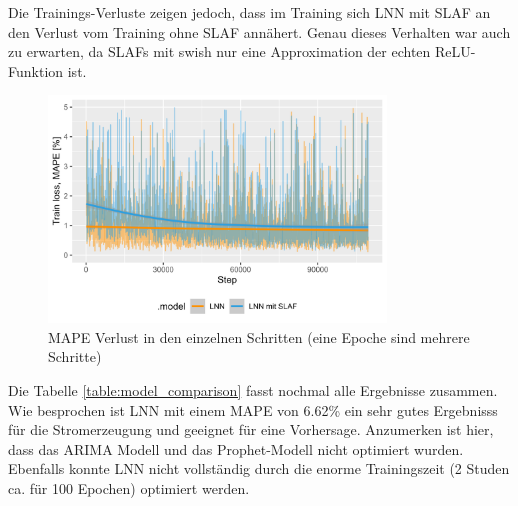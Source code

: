 \documentclass[11pt,ngerman,a4paper,]{article}
\begin{document}
Die Trainings-Verluste zeigen jedoch, dass im Training sich LNN mit SLAF an den Verlust vom Training ohne SLAF annähert. Genau dieses Verhalten war auch zu erwarten, da SLAFs mit swish nur eine Approximation der echten ReLU-Funktion ist.

\begin{figure}[H]
\centering
\includegraphics[width=0.8\textwidth]{plots/training_loss.png}
\caption{MAPE Verlust in den einzelnen Schritten (eine Epoche sind mehrere Schritte)}
\label{fig:train_loss}
\end{figure}

\clearpage
\newpage

Die Tabelle \ref{table:model_comparison} fasst nochmal alle Ergebnisse zusammen. Wie besprochen ist LNN mit einem MAPE von 6.62\% ein sehr gutes Ergebnisss für die Stromerzeugung und geeignet für eine Vorhersage. Anzumerken ist hier, dass das ARIMA Modell und das Prophet-Modell nicht optimiert wurden. Ebenfalls konnte LNN nicht vollständig durch die enorme Trainingszeit (2 Studen ca. für 100 Epochen) optimiert werden.
\end{document}
